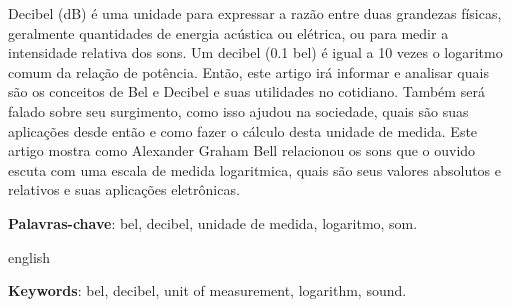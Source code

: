\begin{resumoumacoluna}
Decibel (dB) é uma unidade para expressar a razão entre duas grandezas físicas, geralmente quantidades de energia acústica ou elétrica, ou para medir a intensidade relativa dos sons. Um decibel (0.1 bel) é igual a 10 vezes o logaritmo comum da relação de potência. Então, este artigo irá informar e analisar quais são os conceitos de Bel e Decibel e suas utilidades no cotidiano. Também será falado sobre seu surgimento, como isso ajudou na sociedade, quais são suas aplicações desde então e como fazer o cálculo desta unidade de medida. Este artigo mostra como Alexander Graham Bell relacionou os sons que o ouvido escuta com uma escala de medida logaritmica, quais são seus valores absolutos e relativos e suas aplicações eletrônicas.

 \vspace{\onelineskip}
 
 \noindent
 \textbf{Palavras-chave}: bel, decibel, unidade de medida, logaritmo, som.
\end{resumoumacoluna}

\renewcommand{\resumoname}{}
\begin{resumoumacoluna}
 \begin{otherlanguage*}{english}
   \vspace{\onelineskip}
 
   \noindent
   \textbf{Keywords}: bel, decibel, unit of measurement, logarithm, sound.
   \newpage
 \end{otherlanguage*}  
\end{resumoumacoluna}